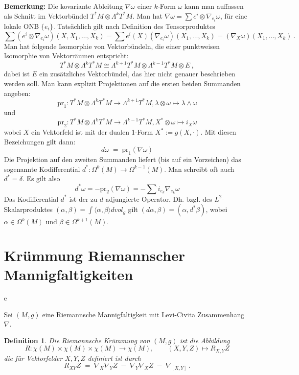 \documentclass[12pt,a4paper]{article}
\def\pr{\mathrm{pr}}
\def\la{\langle}
\def\ra{\rangle}
\newtheorem{Definition}[Lemma]{Definition}
\begin{document}
{\bf Bemerkung:}
Die kovariante Ableitung $\nabla \omega$ einer $k$-Form $\omega$ kann man auffassen
als Schnitt im Vektorb\"undel $T^*M \otimes \Lambda^k T^*M$. Man hat
$\nabla \omega = \sum e^i \otimes \nabla_{e_i} \omega$, f\"ur eine lokale ONB $\{e_i\}$.
Tats\"achlich gilt nach Definition des Tensorproduktes
$$
\sum (e^i \otimes \nabla_{e_i} \omega )(X, X_1,\ldots, X_k)
=
\sum e^i(X ) (\nabla_{e_i} \omega) (X_1,\ldots, X_k)
=
(\nabla_X \omega)(X_1,\ldots, X_k) \ .
$$
Man hat folgende Isomorphie von Vektorb\"undeln, die einer punktweisen Isomorphie
von Vektorr\"aumen entspricht:
$$
T^*M \otimes \Lambda^k T^*M \cong \Lambda^{k+1}T^*M \otimes \Lambda^{k-1}T^*M \otimes E \ ,
$$
dabei ist $E$ ein zus\"atzliches Vektorb\"undel, das hier nicht genauer beschrieben
werden soll. Man kann explizit Projektionen auf die ersten beiden Summanden angeben:
$$
\pr_1 :T^*M \otimes \Lambda^k T^*M \rightarrow \Lambda^{k+1}T^*M,
\lambda \otimes \omega \mapsto \lambda \wedge \omega
$$
und
$$
\pr_2 :T^*M \otimes \Lambda^k T^*M \rightarrow \Lambda^{k-1}T^*M,
X^* \otimes \omega \mapsto i_X \omega
$$
wobei $X$ ein Vektorfeld ist mit der dualen 1-Form $X^* := g(X, \cdot)$. Mit diesen
Bezeichungen gilt dann:
$$
d \omega \;=\; \pr_1(\nabla \omega)
$$
Die Projektion auf den zweiten Summanden liefert  (bis auf ein Vorzeichen) das sogenannte
Kodifferential
$d^* : \Omega^k(M) \rightarrow \Omega^{k-1}(M)$. Man schreibt oft auch $d^* = \delta$. Es gilt also
$$
d^*\omega = - \pr_2(\nabla \omega) = - \sum i_{e_k} \nabla_{e_k} \omega
$$
Das Kodifferential $d^*$ ist der zu $d$ adjungierte Operator. Dh. bzgl. des
$L^2$-Skalarproduktes $(\alpha, \beta)  = \int \la \alpha, \beta\ra dvol_g$ gilt
$(d\alpha, \beta) = (\alpha, d^*\beta)$, wobei $\alpha \in \Omega^k(M)$ und
$\beta \in \Omega^{k+1}(M)$.


\newcommand{\ep}{\varepsilon}
\newcommand{\abs}[1]{|#1|}
\newcommand{\scal}{\mathrm{scal}}

\section{Kr\"ummung Riemannscher Mannigfaltigkeiten} e

Sei $(M, g)$ eine Riemannsche Mannigfaltigkeit mit Levi-Civita Zusammenhang $\nabla$.

\begin{Definition}
Die {\em Riemannsche Kr\"ummung }  von $(M,g)$ ist die Abbildung
$$
R: \chi(M) \times \chi(M) \times \chi(M) \rightarrow \chi(M), \qquad
(X,Y,Z) \mapsto R_{X, Y}Z
$$
die f\"ur Vektorfelder $X, Y, Z$ definiert ist durch
$$
R_{X Y}Z \;=\; \nabla_X \nabla_Y Z \;-\; \nabla_Y\nabla_XZ \;-\; \nabla_{[X,Y]} \ .
$$
\end{Definition}
\end{document}

